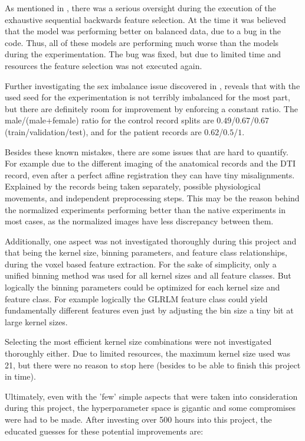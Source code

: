 As mentioned in , there was a serious oversight during the execution of the exhaustive sequential backwards feature selection. At the time it was believed that the model was performing better on balanced data, due to a bug in the code. Thus, all of these models are performing much worse than the models during the experimentation. The bug was fixed, but due to limited time and resources the feature selection was not executed again.\par
Further investigating the sex imbalance issue discovered in , reveals that with the used seed for the experimentation is not terribly imbalanced for the most part, but there are definitely room for improvement by enforcing a constant ratio. The male/(male+female) ratio for the control record splits are $0.49$/$0.67$/$0.67$ (train/validation/test), and for the patient records are $0.62$/$0.5$/$1$.\par
Besides these known mistakes, there are some issues that are hard to quantify. For example due to the different imaging of the anatomical records and the \ac{DTI} record, even after a perfect affine registration they can have tiny misalignments. Explained by the records being taken separately, possible physiological movements, and independent preprocessing steps. This may be the reason behind the normalized experiments performing better than the native experiments in most cases, as the normalized images have less discrepancy between them.\par
Additionally, one aspect was not investigated thoroughly during this project and that being the kernel size, binning parameters, and feature class relationships, during the voxel based feature extraction. For the sake of simplicity, only a unified binning method was used for all kernel sizes and all feature classes. But logically the binning parameters could be optimized for each kernel size and feature class. For example logically the \ac{GLRLM} feature class could yield fundamentally different features even just by adjusting the bin size a tiny bit at large kernel sizes.\par
Selecting the most efficient kernel size combinations were not investigated thoroughly either. Due to limited resources, the maximum kernel size used was 21, but there were no reason to stop here (besides to be able to finish this project in time).\par
Ultimately, even with the 'few' simple aspects that were taken into consideration during this project, the hyperparameter space is gigantic and some compromises were had to be made. After investing over 500 hours into this project, the educated guesses for these potential improvements are:
